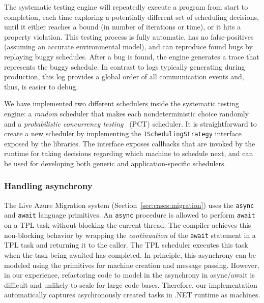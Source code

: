 The \psharp systematic testing engine will repeatedly execute a program from start to completion, each time exploring a potentially different set of scheduling decisions, until it either reaches a bound (in number of iterations or time), or it hits a property violation. This testing process is fully automatic, has no false-positives (assuming an accurate environmental model), and can reproduce found bugs by replaying buggy schedules. After a bug is found, the engine generates a trace that represents the buggy schedule. In contrast to logs typically generating during production, this log provides a global order of all communication events and, thus, is easier to debug.

We have implemented two different schedulers inside the \psharp systematic testing engine: a \emph{random} scheduler that makes each nondeterministic choice randomly and a \emph{probabilistic concurrency testing}~\cite{burckhardt2010pct} (PCT) scheduler. It is straightforward to create a new scheduler by implementing the \texttt{ISchedulingStrategy} interface~\cite{desai2015systematic} exposed by the \psharp libraries. The interface exposes callbacks that are invoked by the \psharp runtime for taking decisions regarding which machine to schedule next, and can be used for developing both generic and application-specific schedulers.

\subsubsection{Handling  asynchrony}
\label{sec:psharp:async}

The Live Azure Migration system (Section~\ref{sec:cases:migration}) uses the \texttt{async} and \texttt{await}  language primitives.
An \texttt{async} procedure is allowed to perform \texttt{await} on a TPL task without blocking the current thread.
The \csharp compiler achieves this non-blocking behavior by wrapping the \emph{continuation} of the \texttt{await} statement
in a TPL task and returning it to the caller.
The TPL scheduler executes this task when the task being awaited has completed.
In principle, this asynchrony can be modeled using the \psharp primitives for machine creation and message passing.
However, in our experience, refactoring code to model in \psharp the asynchrony in async/await is difficult and unlikely
to scale for large code bases.
Therefore, our implementation automatically captures asychronously created tasks in .NET runtime as \psharp machines.


